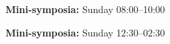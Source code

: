 \begin{center}
\label{mini-sunday1}
{\large {\bf Mini-symposia:} Sunday 08:00--10:00}
\end{center}
\vspace{1ex}



\begin{center}
\label{mini-sunday2}
{\large {\bf Mini-symposia:} Sunday 12:30--02:30}
\end{center}
\vspace{1ex}

